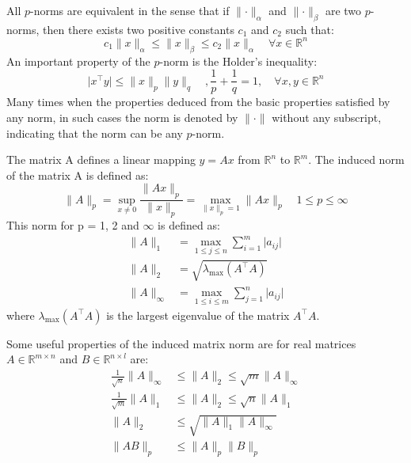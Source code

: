 All \(p\)-norms are equivalent in the sense that if \(\lVert \cdot \rVert_\alpha\) and
\(\lVert \cdot \rVert_\beta\) are two \(p\)-norms, then there exists two positive constants
\(c_1\) and \(c_2\) such that:
\[
    c_1 \lVert x \rVert_\alpha \leq \lVert x \rVert_\beta \leq c_2 \lVert x \rVert_\alpha \quad \forall x \in \mathbb{R}^n
\]
An important property of the \(p\)-norm is the Holder's inequality: 
\[
    \lvert x^{\top} y \rvert \leq \lVert x \rVert_p \lVert y \rVert_q \quad,
    \frac{1}{p} + \frac{1}{q} = 1, \quad  \forall x, y \in \mathbb{R}^n
\]
Many times when the properties deduced from the basic properties satisfied by any norm, in 
such cases the norm is denoted by \(\lVert \cdot \rVert\) without any subscript, indicating
that the norm can be any \(p\)-norm.

The matrix A defines a linear mapping \(y = Ax\) from \(\mathbb{R}^n\) to \(\mathbb{R}^m\).
The induced norm of the matrix A is defined as:
\[
    \lVert A \rVert_p = \sup\limits_{x \neq 0} \frac{\lVert Ax \rVert_p}{\lVert x \rVert_p}
    = \max\limits_{\lVert x \rVert_p = 1} \lVert Ax \rVert_p \quad 1 \leq p \leq \infty
\]
This norm for p = 1, 2 and \(\infty\) is defined as:
\[
    \begin{aligned}
        \lVert A \rVert_1 &= \max\limits_{1 \leq j \leq n} \sum\limits_{i=1}^{m} \lvert a_{ij} \rvert \\
        \lVert A \rVert_2 &= \sqrt{\lambda_{\max}(A^{\top} A)} \\
        \lVert A \rVert_{\infty} &= \max\limits_{1 \leq i \leq m} \sum\limits_{j=1}^{n} \lvert a_{ij} \rvert
    \end{aligned}  
\]
where \(\lambda_{\max}(A^{\top} A)\) is the largest eigenvalue of the matrix \(A^{\top} A\).

Some useful properties of the induced matrix norm are for real matrices \(A \in \mathbb{R}^{m \times n}\)
and \(B \in \mathbb{R}^{n \times l}\) are:
\[
    \begin{aligned}
        \frac{1}{\sqrt{n}} \lVert A \rVert_\infty &\leq \lVert A \rVert_2 \leq \sqrt{m} \lVert A \rVert_\infty \\
        \frac{1}{\sqrt{m}} \lVert A \rVert_1 &\leq \lVert A \rVert_2 \leq \sqrt{n} \lVert A \rVert_1 \\
        \lVert A \rVert_2 & \leq \sqrt{\lVert A \rVert_1 \lVert A \rVert_\infty} \\
        \lVert AB \rVert_p & \leq \lVert A \rVert_p \lVert B \rVert_p \\
    \end{aligned}
\]

